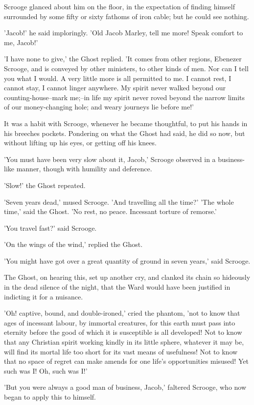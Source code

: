 Scrooge glanced about him on the floor, in the expectation of finding
himself surrounded by some fifty or sixty fathoms of iron cable; but he
could see nothing.

'Jacob!' he said imploringly. 'Old Jacob Marley, tell me more! Speak
comfort to me, Jacob!'

'I have none to give,' the Ghost replied. 'It comes from other regions,
Ebenezer Scrooge, and is conveyed by other ministers, to other kinds of
men. Nor can I tell you what I would. A very little more is all
permitted to me. I cannot rest, I cannot stay, I cannot linger anywhere.
My spirit never walked beyond our counting-house--mark me;--in life my
spirit never roved beyond the narrow limits of our money-changing hole;
and weary journeys lie before me!'

It was a habit with Scrooge, whenever he became thoughtful, to put his
hands in his breeches pockets. Pondering on what the Ghost had said, he
did so now, but without lifting up his eyes, or getting off his knees.

'You must have been very slow about it, Jacob,' Scrooge observed in a
business-like manner, though with humility and deference.

'Slow!' the Ghost repeated.

'Seven years dead,' mused Scrooge. 'And travelling all the time?'
'The whole time,' said the Ghost. 'No rest, no peace. Incessant torture
of remorse.'

'You travel fast?' said Scrooge.

'On the wings of the wind,' replied the Ghost.

'You might have got over a great quantity of ground in seven years,'
said Scrooge.

The Ghost, on hearing this, set up another cry, and clanked its chain so
hideously in the dead silence of the night, that the Ward would have
been justified in indicting it for a nuisance.

'Oh! captive, bound, and double-ironed,' cried the phantom, 'not to know
that ages of incessant labour, by immortal creatures, for this earth
must pass into eternity before the good of which it is susceptible is
all developed! Not to know that any Christian spirit working kindly in
its little sphere, whatever it may be, will find its mortal life too
short for its vast means of usefulness! Not to know that no space of
regret can make amends for one life's opportunities misused! Yet such
was I! Oh, such was I!'

'But you were always a good man of business, Jacob,' faltered Scrooge,
who now began to apply this to himself.

